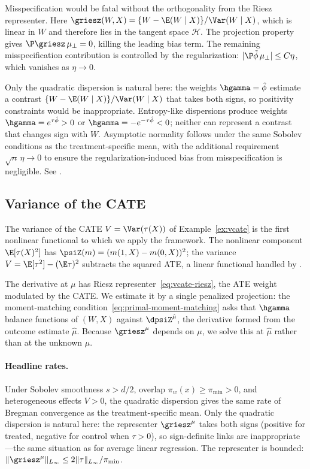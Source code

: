 \documentclass{article}
\begin{document}
Misspecification would be fatal
without the orthogonality from
the Riesz representer.
Here $\griesz(W,X) = \{W - \E(W \mid X)\}/\Var(W \mid X)$,
which is linear in $W$
and therefore lies in the tangent space $\mathcal{H}$.
The projection property gives
$\P\griesz\, \mu_\perp = 0$,
killing the leading bias term.
The remaining misspecification contribution
is controlled by the regularization:
$|\P\tilde\phi\, \mu_\perp| \le C\eta$,
which vanishes as $\eta \to 0$.

Only the quadratic dispersion is natural here:
the weights $\hgamma = \hat\phi$
estimate a contrast $\{W - \E(W \mid X)\}/\Var(W \mid X)$
that takes both signs,
so positivity constraints would be inappropriate.
Entropy-like dispersions produce weights
$\hgamma = e^{\tau\hat\phi} > 0$
or $\hgamma = -e^{-\tau\hat\phi} < 0$;
neither can represent a contrast
that changes sign with $W$.
Asymptotic normality follows
under the same Sobolev conditions as the
treatment-specific mean,
with the additional requirement
$\sqrt{n}\,\eta \to 0$
to ensure the regularization-induced bias
from misspecification is negligible.
See .

\subsection{Variance of the CATE}
\label{sec:example-vcate}

The variance of the CATE
$V = \Var(\tau(X))$
of Example~\ref{ex:vcate}
is the first nonlinear functional
to which we apply the framework.
The nonlinear component
$\E[\tau(X)^2]$
has $\psiZ(m) = (m(1,X) - m(0,X))^2$;
the variance
$V = \E[\tau^2] - (\E\tau)^2$
subtracts the squared ATE,
a linear functional
handled by .

The derivative at $\mu$
has Riesz representer~\eqref{eq:vcate-riesz},
the ATE weight modulated by the CATE.
We estimate it by a single penalized projection:
the moment-matching condition~\eqref{eq:primal-moment-matching}
asks that $\hgamma$ balance functions of $(W,X)$
against $\dpsiZ^{\hat\mu}$,
the derivative formed from the outcome estimate $\hat\mu$.
Because $\griesz^\mu$ depends on $\mu$,
we solve this at $\hat\mu$
rather than at the unknown $\mu$.

\paragraph{Headline rates.}
Under Sobolev smoothness $s > d/2$,
overlap $\pi_w(x) \ge \pi_{\min} > 0$,
and heterogeneous effects $V > 0$,
the quadratic dispersion gives the same
rate of Bregman convergence
as the treatment-specific mean.
Only the quadratic dispersion is natural here:
the representer $\griesz^\mu$
takes both signs
(positive for treated, negative for control
when $\tau > 0$),
so sign-definite links
are inappropriate---the same
situation as for average linear regression.
The representer is bounded:
$\|\griesz^\mu\|_{L_\infty}
  \le 2\|\tau\|_{L_\infty}/\pi_{\min}$.
\end{document}
